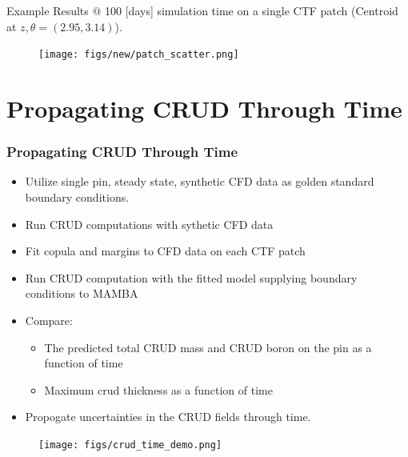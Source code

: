 \documentclass[t, pdftex]{beamer}
\begin{document}
\begin{frame}
\tiny Example Results $@$ 100 [days] simulation time on a single CTF patch (Centroid at $z,\theta=(2.95, 3.14)$). 
\begin{figure}[!htbp]
\centering
\texttt{[image: figs/new/patch\_scatter.png]}
\label{model_overview}
\end{figure}
\end{frame}

\section{Propagating CRUD Through Time}
\begin{frame}[shrink=2]
\frametitle{Propagating CRUD Through Time}
\begin{itemize}
\item Utilize single pin, steady state, synthetic CFD data as golden standard boundary conditions.
\item Run CRUD computations with sythetic CFD data 
\item Fit copula and margins to CFD data on each CTF patch 
\item Run CRUD computation with the fitted model supplying boundary conditions to MAMBA
\item Compare:
\begin{itemize}
\item The predicted total CRUD mass and CRUD boron on the pin as a function of time
\item Maximum crud thickness as a function of time
\end{itemize}
\item Propogate uncertainties in the CRUD fields through time.
\end{itemize}
\begin{figure}[!htbp]
\centering
\texttt{[image: figs/crud\_time\_demo.png]}
\label{model_overview}
\end{figure}
\end{frame}
\end{document}
